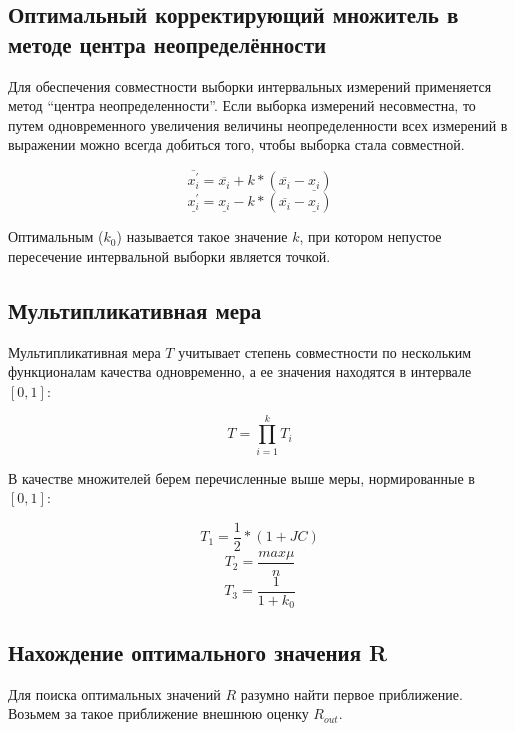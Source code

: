 \documentclass[a4paper,12pt]{article}
\begin{document}
\subsection{Оптимальный корректирующий множитель в методе центра
неопределённости}
\quad Для обеспечения совместности выборки интервальных измерений
применяется метод ``центра неопределенности''. Если выборка измерений
несовместна, то путем одновременного увеличения величины неопределенности
всех измерений в выражении можно всегда добиться того, чтобы выборка стала
совместной.

\begin{equation}
  \overline{x_{i}^{'}} = \overline{x_{i}} + k * (\overline{x_{i}} - \underline{x_{i}})
\end{equation}
\begin{equation}
  \underline{x_{i}^{'}} = \underline{x_{i}} - k * (\overline{x_{i}} - \underline{x_{i}})
\end{equation}

Оптимальным ($ k_{0} $) называется такое значение $ k $, при котором
непустое пересечение интервальной выборки является точкой.

\subsection{Мультипликативная мера}
\quad Мультипликативная мера $ T $ учитывает степень совместности по
нескольким функционалам качества одновременно, а ее значения находятся
в интервале $ [0, 1] $:

\begin{equation}
  T = \prod_{i=1}^k T_i
  \label{e:Mult}
\end{equation}

В качестве множителей берем перечисленные выше меры, нормированные в
$ [0, 1] $:

\begin{equation}
  T_1 = \frac{1}{2} * (1 + JC)
\end{equation}
\begin{equation}
  T_2 = \frac{max \mu}{n}
\end{equation}
\begin{equation}
  T_3 = \frac{1}{1 + k_{0}}
\end{equation}

\subsection{Нахождение оптимального значения R}
\quad Для поиска оптимальных значений $ R $ разумно найти первое
приближение. Возьмем за такое приближение внешнюю оценку $ R_{out} $.
\end{document}
